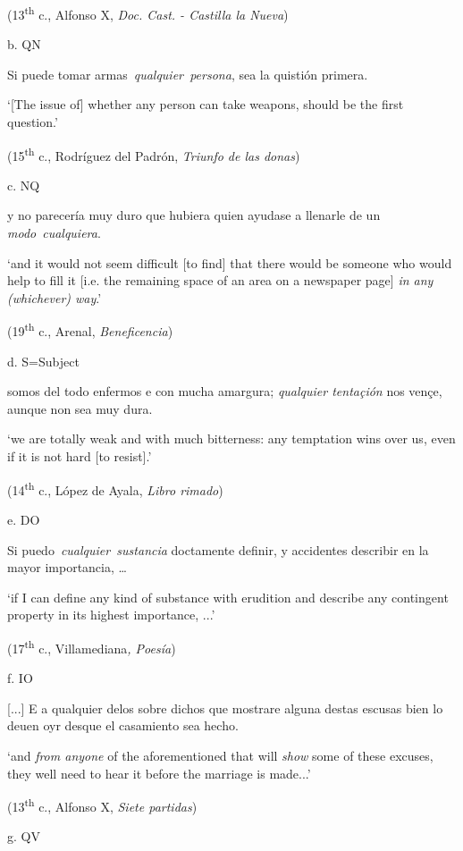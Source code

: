     (13\textsuperscript{th} c., Alfonso X, \textit{Doc. Cast. - Castilla la Nueva})

  b.  QN

    Si puede tomar armas~\textit{qualquier~persona}, sea la quistión primera. 

    ‘[The issue of] whether any person can take weapons, should be the first question.’

    (15\textsuperscript{th} c., Rodríguez del Padrón, \textit{Triunfo de las donas})

  c.  NQ

    y no parecería muy duro que hubiera quien ayudase a llenarle de un \textit{modo}~\textit{cualquiera}. 

    ‘and it would not seem difficult [to find] that there would be someone who would help to fill it [i.e. the remaining space of an area on a newspaper page] \textit{in any (whichever) way}.’

    (19\textsuperscript{th} c., Arenal, \textit{Beneficencia})

  d.  S=Subject

    somos del todo enfermos e con mucha amargura; \textit{qualquier tentaçión} nos vençe, aunque non sea muy dura. 

    ‘we are totally weak and with much bitterness: any temptation wins over us, even if it is not hard [to resist].’

    (14\textsuperscript{th} c., López de Ayala, \textit{Libro rimado})

  e.  DO

    Si puedo~\textit{cualquier~sustancia} doctamente definir, y accidentes describir en la mayor importancia, … 

    ‘if I can define any kind of substance with erudition and describe any contingent property in its highest importance, ...’

    (17\textsuperscript{th} c., Villamediana\textit{, Poesía})

  f.  IO

    [...] E a qualquier delos sobre dichos que mostrare alguna destas escusas bien lo deuen oyr desque el casamiento sea hecho. 

    ‘and \textit{from anyone} of the aforementioned that will \textit{show} some of these excuses, they well need to hear it before the marriage is made...’

    (13\textsuperscript{th} c., Alfonso X, \textit{Siete partidas})

  g.  QV

